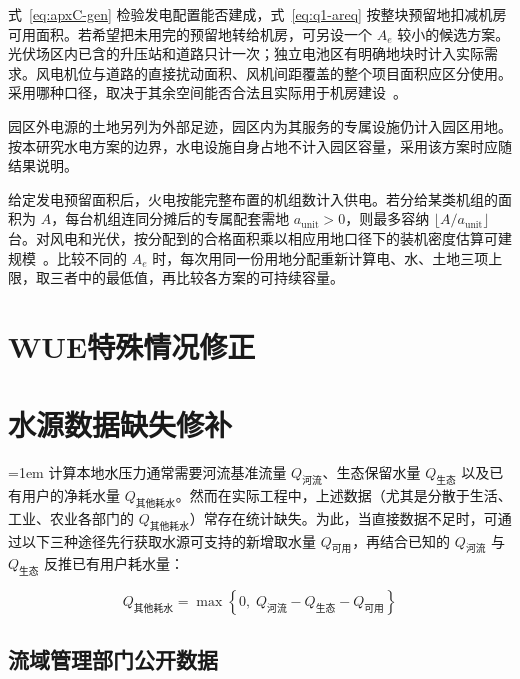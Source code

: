 式~\eqref{eq:apxC-gen} 检验发电配置能否建成，式~\eqref{eq:q1-areq} 按整块预留地扣减机房可用面积。若希望把未用完的预留地转给机房，可另设一个 $A_e$ 较小的候选方案。光伏场区内已含的升压站和道路只计一次；独立电池区有明确地块时计入实际需求。风电机位与道路的直接扰动面积、风机间距覆盖的整个项目面积应区分使用。采用哪种口径，取决于其余空间能否合法且实际用于机房建设~\cite{apxrefL03,apxrefL04,apxrefL05}。

园区外电源的土地另列为外部足迹，园区内为其服务的专属设施仍计入园区用地。按本研究水电方案的边界，水电设施自身占地不计入园区容量，采用该方案时应随结果说明。

给定发电预留面积后，火电按能完整布置的机组数计入供电。若分给某类机组的面积为 $A$，每台机组连同分摊后的专属配套需地 $a_{\mathrm{unit}}>0$，则最多容纳 $\lfloor A/a_{\mathrm{unit}}\rfloor$ 台。对风电和光伏，按分配到的合格面积乘以相应用地口径下的装机密度估算可建规模~\cite{apxrefL04,apxrefL05}。比较不同的 $A_e$ 时，每次用同一份用地分配重新计算电、水、土地三项上限，取三者中的最低值，再比较各方案的可持续容量。

\section{WUE特殊情况修正}\label{apx:d}

\section{水源数据缺失修补}\label{apx:e}

{\emergencystretch=1em
计算本地水压力通常需要河流基准流量 $Q_{\text{河流}}$、生态保留水量 $Q_{\text{生态}}$ 以及已有用户的净耗水量 $Q_{\text{其他耗水}}$。然而在实际工程中，上述数据（尤其是分散于生活、工业、农业各部门的 $Q_{\text{其他耗水}}$）常存在统计缺失。为此，当直接数据不足时，可通过以下三种途径先行获取水源可支持的新增取水量 $Q_{\text{可用}}$，再结合已知的 $Q_{\text{河流}}$ 与 $Q_{\text{生态}}$ 反推已有用户耗水量：\par}

\begin{equation}\label{eq:apxE-reverse}
Q_{\text{其他耗水}} = \max\left\{0,\; Q_{\text{河流}} - Q_{\text{生态}} - Q_{\text{可用}}\right\}
\end{equation}

\subsection{流域管理部门公开数据}\label{apx:e1}

